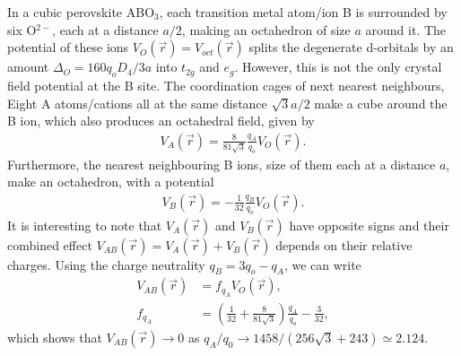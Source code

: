 \documentclass[a4paper,prb]{revtex4-1}  %
\begin{document}
In a cubic perovskite ABO$_3$,
each transition metal atom/ion B
is surrounded by six O$^{2-}$, each at a distance $a/2$,
 making an octahedron of size $a$ around it.
The potential of these ions $V_{O}(\vec r)= V_{oct}(\vec r)$
splits the degenerate d-orbitals
by an amount ${\Delta_O=160q_oD_{4}/3a}$
 into $t_{2g}$ and $e_g$.
However, this is not the only crystal field potential at the B site.
The coordination cages of next nearest neighbours, 
Eight A atoms/cations all at the same distance $\sqrt{3}a/2$
make a cube around the B ion,
which also produces an octahedral field, given by 
\begin{align}
V_{A}(\vec r) = \frac{8}{81 \sqrt{3}}\frac{q_A}{q_o} V_{O}(\vec r).
\end{align}
Furthermore,
the nearest neighbouring B ions, size of them each at a distance $a$,
make an octahedron, with a potential 
\begin{align}
V_{B}(\vec r) = -\frac{1}{32}\frac{q_B}{q_o}V_{O}(\vec r).
\end{align}
It is interesting to note that 
$V_{A}(\vec r)$ and $V_{B}(\vec r)$ have opposite signs
and 
their combined effect 
$V_{AB}(\vec r) = V_{A}(\vec r)+ V_{B}(\vec r)$
depends on their relative charges.
Using the charge neutrality $q_B=3q_o-q_A$,
we can write 
\begin{align}
V_{AB}(\vec r) &= f_{q_A}V_{O}(\vec r),\\
f_{q_A} &= \left(\frac{1}{32}+\frac{8}{81 \sqrt{3}}\right)\frac{q_A}{q_o} -\frac{3}{32},
\end{align}
which shows that $V_{AB}(\vec r)\to 0$
as
${q_A/q_0\to 1458/({256 \sqrt{3}+243})\simeq 2.124}$.
\end{document}
